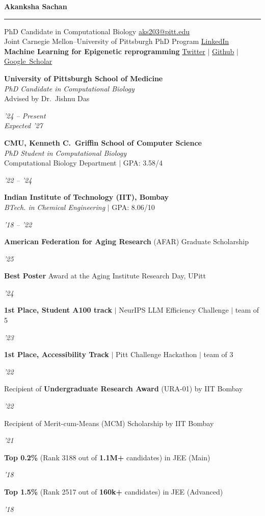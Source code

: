 \documentclass[11pt,letterpaper]{article}
\newlength{\cvlabelw}\setlength{\cvlabelw}{1.15in}   %
\newlength{\cvlabelsep}\setlength{\cvlabelsep}{0.15in}%
\newlength{\cvdatew}\setlength{\cvdatew}{1.15in}     %
\newcommand{\cvsection}[1]{%
  \par\addvspace{\baselineskip}\needspace{3\baselineskip}%
  \noindent\llap{\raisebox{0pt}[\height][0pt]{%
    \parbox[t]{\cvlabelw}{\raggedright\normalfont\scshape\bfseries
      \textcolor{sectionpurple}{#1}}}\hspace{\cvlabelsep}}%
  \nopagebreak\ignorespaces}
\newcommand{\entry}[2]{%
  \parbox[t]{\dimexpr\linewidth-\cvdatew-\cvlabelsep\relax}{\raggedright #1}%
  \hfill
  \parbox[t]{\cvdatew}{\raggedleft\small\textsl{#2}}\par}
\begin{document}
{\LARGE\bfseries Akanksha Sachan}\par
\nobreak\vspace{1.5pt}
\noindent\rule{\textwidth}{0.9pt}

\cvsection{Contact}%
PhD Candidate in Computational Biology \hfill
  \href{mailto:aks203@pitt.edu}{aks203@pitt.edu}\\
Joint Carnegie Mellon--University of Pittsburgh PhD Program \hfill
  \href{https://www.linkedin.com/in/akanksha-sachan/}{LinkedIn}\\
\textbf{Machine Learning for Epigenetic reprogramming} \hfill
  \href{https://x.com/sachha_naksha}{Twitter} \enspace$\mid$\enspace
  \href{https://github.com/sachha-naksha}{Github} \enspace$\mid$\enspace
  \href{https://scholar.google.com/citations?user=2fIjbc0AAAAJ}{Google~Scholar}


\cvsection{Education}%
\entry{\textbf{University of Pittsburgh School of Medicine} \\
\textit{PhD Candidate in Computational Biology} \\
Advised by Dr.\ Jishnu Das}{'24 -- Present\\Expected '27}

\vspace{6pt}
\entry{\textbf{CMU, Kenneth C.\ Griffin School of Computer Science} \\
\textit{PhD Student in Computational Biology} \\
Computational Biology Department $\mid$ GPA: 3.58/4}{'22 -- '24}

\vspace{6pt}
\entry{\textbf{Indian Institute of Technology (IIT), Bombay} \\
\textit{BTech. in Chemical Engineering} $\mid$ GPA: 8.06/10}{'18 -- '22}

\cvsection{Awards and Honors}%
{\setlength{\cvdatew}{0.6in}%
\entry{\textbf{American Federation for Aging Research} (AFAR) Graduate Scholarship}{'25}
\entry{\textbf{Best Poster} Award at the Aging Institute Research Day, UPitt}{'24}
\entry{\textbf{1st Place, Student A100 track} $\mid$ NeurIPS LLM Efficiency Challenge $\mid$ team of 5}{'23}
\entry{\textbf{1st Place, Accessibility Track} $\mid$ Pitt Challenge Hackathon $\mid$ team of 3}{'22}
\entry{Recipient of \textbf{Undergraduate Research Award} (URA-01) by IIT Bombay}{'22}
\entry{Recipient of Merit-cum-Means (MCM) Scholarship by IIT Bombay}{'21}
\entry{\textbf{Top 0.2\%} (Rank 3188 out of \textbf{1.1M+} candidates) in JEE (Main)}{'18}
\entry{\textbf{Top 1.5\%} (Rank 2517 out of \textbf{160k+} candidates) in JEE (Advanced)}{'18}
}%
\end{document}
